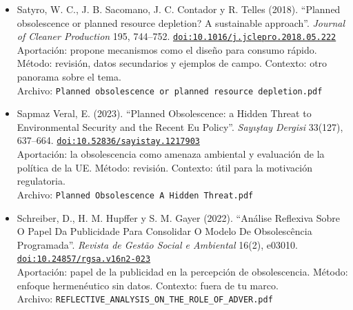 \documentclass[11pt]{article}
\begin{document}
\begin{itemize}
{\footnotesize Archivo: \texttt{Beyond PO.pdf}}
\item Satyro, W. C., J. B. Sacomano, J. C. Contador y R. Telles (2018). ``Planned obsolescence or planned resource depletion? A sustainable approach''. \textit{Journal of Cleaner Production} 195, 744--752. \href{https://doi.org/10.1016/j.jclepro.2018.05.222}{\texttt{doi:10.1016/j.jclepro.2018.05.222}}\\
Aportación: propone mecanismos como el diseño para consumo rápido. Método: revisión, datos secundarios y ejemplos de campo. Contexto: otro panorama sobre el tema.\\
{\footnotesize Archivo: \texttt{Planned obsolescence or planned resource depletion.pdf}}
\item Sapmaz Veral, E. (2023). ``Planned Obsolescence: a Hidden Threat to Environmental Security and the Recent Eu Policy''. \textit{Sayıştay Dergisi} 33(127), 637--664. \href{https://doi.org/10.52836/sayistay.1217903}{\texttt{doi:10.52836/sayistay.1217903}}\\
Aportación: la obsolescencia como amenaza ambiental y evaluación de la política de la UE. Método: revisión. Contexto: útil para la motivación regulatoria.\\
{\footnotesize Archivo: \texttt{Planned Obsolescence A Hidden Threat.pdf}}
\item Schreiber, D., H. M. Hupffer y S. M. Gayer (2022). ``Análise Reflexiva Sobre O Papel Da Publicidade Para Consolidar O Modelo De Obsolescência Programada''. \textit{Revista de Gestão Social e Ambiental} 16(2), e03010. \href{https://doi.org/10.24857/rgsa.v16n2-023}{\texttt{doi:10.24857/rgsa.v16n2-023}}\\
Aportación: papel de la publicidad en la percepción de obsolescencia. Método: enfoque hermenéutico sin datos. Contexto: fuera de tu marco.\\
{\footnotesize Archivo: \texttt{REFLECTIVE\_ANALYSIS\_ON\_THE\_ROLE\_OF\_ADVER.pdf}}
\end{itemize}
\end{document}
